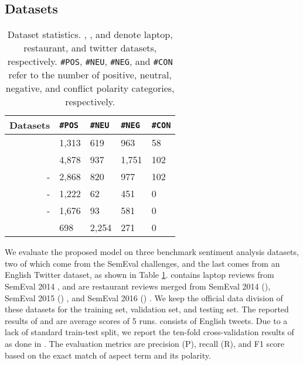 \documentclass[11pt,a4paper]{article}
\begin{document}
\subsection{Datasets}
\begin{table}[tp]
\small
\begin{center}
    \begin{tabular}{|l|l|l|l|l|}
    \hline
    Datasets & \texttt{\#POS} & \texttt{\#NEU} & \texttt{\#NEG} & \texttt{\#CON} \\ \hline \hline
           & 1,313 & 619   & 963   & 58    \\ \hline
           & 4,878 & 937 & 1,751 & 102 \\
    \multicolumn{1}{|r|}{- }   & 2,868 & 820 & 977 & 102 \\
    \multicolumn{1}{|r|}{- }   & 1,222 & 62  & 451 & 0   \\
    \multicolumn{1}{|r|}{- }   & 1,676 & 93  & 581 & 0   \\ \hline
           & 698      & 2,254 & 271 & 0 \\ \hline
    \end{tabular}
\end{center}
\caption{\label{table_datasets} Dataset statistics. , , and  denote laptop, restaurant, and twitter datasets, respectively. \texttt{\#POS}, \texttt{\#NEU}, \texttt{\#NEG}, and \texttt{\#CON} refer to the number of positive, neutral, negative, and conflict polarity categories, respectively.}
\end{table}
We evaluate the proposed model on three benchmark sentiment analysis datasets, two of which come from the SemEval challenges, and the last comes from an English Twitter dataset, as shown in Table \ref{table_datasets}.  contains laptop reviews from SemEval 2014 \cite{Pontiki2014}, and  are restaurant reviews merged from SemEval 2014 (), SemEval 2015 () \cite{Pontiki2015}, and SemEval 2016 () \cite{Pontiki2016}. We keep the official data division of these datasets for the training set, validation set, and testing set. The reported results of  and  are average scores of 5 runs.  consists of English tweets. Due to a lack of standard train-test split, we report the ten-fold cross-validation results of  as done in \cite{Li2019a,Luo2019}. The evaluation metrics are precision (P), recall (R), and F1 score based on the exact match of aspect term and its polarity.
\end{document}
